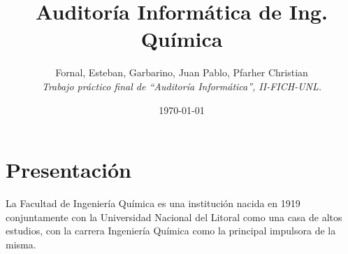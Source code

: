 \documentclass[10pt,a4paper,final]{article}
\begin{document}
\title{Auditoría Informática de Ing. Química}
\author{Fornal, Esteban, Garbarino, Juan Pablo, Pfarher Christian\\
\textit{Trabajo práctico final de ``Auditoría Informática'', II-FICH-UNL.}}
\date{\today}
\maketitle
\newpage
\tableofcontents
\newpage
\section{Presentación}
La Facultad de Ingeniería Química es una institución nacida en 1919 conjuntamente con la Universidad Nacional del Litoral como una casa de altos estudios, con la carrera Ingeniería Química como la principal impulsora de la misma.
\end{document}
